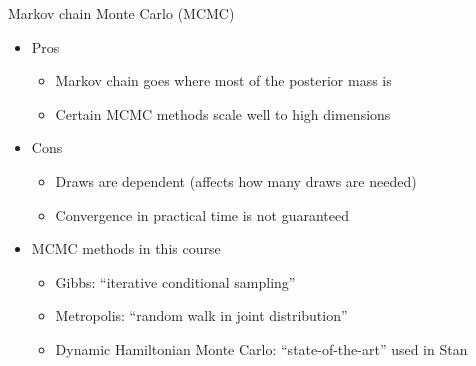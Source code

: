 \documentclass[english,t]{beamer}
\begin{document}
\begin{frame}{Markov chain Monte Carlo (MCMC)}

  \begin{itemize}
  \item Pros
    \begin{itemize}
    \item Markov chain goes where most of the posterior mass is
    \item Certain MCMC methods scale well to high dimensions
    \end{itemize}
  \item Cons
    \begin{itemize}
    \item Draws are dependent (affects how many draws are needed)
    \item Convergence in practical time is not guaranteed
    \end{itemize}
  \item MCMC methods in this course
    \begin{itemize}
    \item Gibbs: ``iterative conditional sampling''
    \item Metropolis: ``random walk in joint distribution''
    \item Dynamic Hamiltonian Monte Carlo: ``state-of-the-art'' used in Stan
    \end{itemize}
  \end{itemize}

\end{frame}
\end{document}
